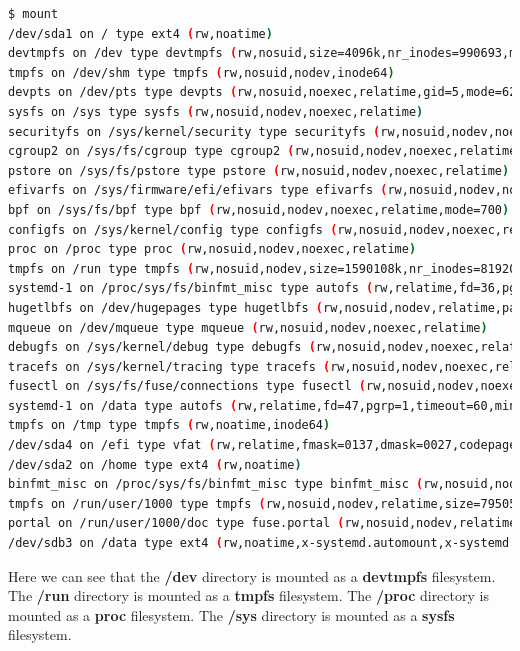 \begin{lstlisting}[language=bash]
  $ mount
/dev/sda1 on / type ext4 (rw,noatime)
devtmpfs on /dev type devtmpfs (rw,nosuid,size=4096k,nr_inodes=990693,mode=755,inode64)
tmpfs on /dev/shm type tmpfs (rw,nosuid,nodev,inode64)
devpts on /dev/pts type devpts (rw,nosuid,noexec,relatime,gid=5,mode=620,ptmxmode=000)
sysfs on /sys type sysfs (rw,nosuid,nodev,noexec,relatime)
securityfs on /sys/kernel/security type securityfs (rw,nosuid,nodev,noexec,relatime)
cgroup2 on /sys/fs/cgroup type cgroup2 (rw,nosuid,nodev,noexec,relatime,nsdelegate,memory_recursiveprot)
pstore on /sys/fs/pstore type pstore (rw,nosuid,nodev,noexec,relatime)
efivarfs on /sys/firmware/efi/efivars type efivarfs (rw,nosuid,nodev,noexec,relatime)
bpf on /sys/fs/bpf type bpf (rw,nosuid,nodev,noexec,relatime,mode=700)
configfs on /sys/kernel/config type configfs (rw,nosuid,nodev,noexec,relatime)
proc on /proc type proc (rw,nosuid,nodev,noexec,relatime)
tmpfs on /run type tmpfs (rw,nosuid,nodev,size=1590108k,nr_inodes=819200,mode=755,inode64)
systemd-1 on /proc/sys/fs/binfmt_misc type autofs (rw,relatime,fd=36,pgrp=1,timeout=0,minproto=5,maxproto=5,direct,pipe_ino=5327)
hugetlbfs on /dev/hugepages type hugetlbfs (rw,nosuid,nodev,relatime,pagesize=2M)
mqueue on /dev/mqueue type mqueue (rw,nosuid,nodev,noexec,relatime)
debugfs on /sys/kernel/debug type debugfs (rw,nosuid,nodev,noexec,relatime)
tracefs on /sys/kernel/tracing type tracefs (rw,nosuid,nodev,noexec,relatime)
fusectl on /sys/fs/fuse/connections type fusectl (rw,nosuid,nodev,noexec,relatime)
systemd-1 on /data type autofs (rw,relatime,fd=47,pgrp=1,timeout=60,minproto=5,maxproto=5,direct,pipe_ino=2930)
tmpfs on /tmp type tmpfs (rw,noatime,inode64)
/dev/sda4 on /efi type vfat (rw,relatime,fmask=0137,dmask=0027,codepage=437,iocharset=ascii,shortname=mixed,utf8,errors=remount-ro)
/dev/sda2 on /home type ext4 (rw,noatime)
binfmt_misc on /proc/sys/fs/binfmt_misc type binfmt_misc (rw,nosuid,nodev,noexec,relatime)
tmpfs on /run/user/1000 type tmpfs (rw,nosuid,nodev,relatime,size=795052k,nr_inodes=198763,mode=700,uid=1000,gid=1001,inode64)
portal on /run/user/1000/doc type fuse.portal (rw,nosuid,nodev,relatime,user_id=1000,group_id=1001)
/dev/sdb3 on /data type ext4 (rw,noatime,x-systemd.automount,x-systemd.idle-timeout=1min)
\end{lstlisting}

Here we can see that the \textbf{/dev} directory is mounted as a \textbf{devtmpfs} filesystem.
The \textbf{/run} directory is mounted as a \textbf{tmpfs} filesystem.
The \textbf{/proc} directory is mounted as a \textbf{proc} filesystem.
The \textbf{/sys} directory is mounted as a \textbf{sysfs} filesystem.

